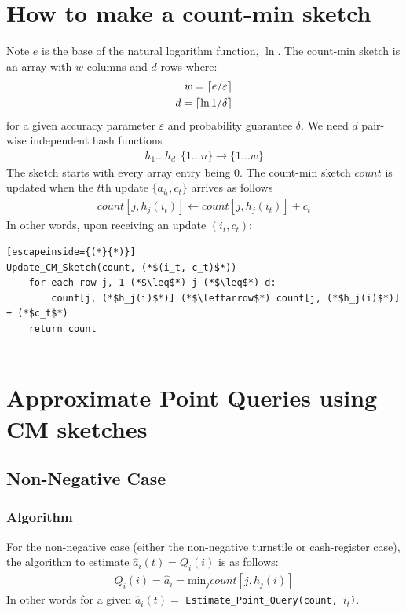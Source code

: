\documentclass[11pt]{article}
\newcommand{\comment}[1]{}
\newcommand{\sq}{\mathit{Q}_i}
\DeclarePairedDelimiter\ceil{\lceil}{\rceil}
\newcommand{\ra}{\rightarrow}
\begin{document}
\section{How to make a count-min sketch}
Note $e$ is the base of the natural logarithm function, $\ln$. The count-min
sketch is an array with $w$ columns and $d$ rows where:
\begin{align}
    w = \ceil{e/\varepsilon}\\
    d = \ceil{\ln{1/\delta}}
\end{align}
for a given accuracy parameter $\varepsilon$ and probability guarantee $\delta$.
We need $d$ pair-wise independent hash functions
\begin{align}
    h_1 \dots h_d : \{1 \dots n\} \ra \{1 \dots w\} 
\end{align}
The sketch starts with every array entry being 0. The count-min sketch $count$
is updated when the $t$th update $\{a_{i_t}, c_t\}$ arrives as follows
\begin{align}
    count[j, h_j(i_t)] \leftarrow count[j, h_j(i_t)] + c_t     
\end{align}
In other words, upon receiving an update $(i_t, c_t)$:
\begin{lstlisting}[escapeinside={(*}{*)}]
Update_CM_Sketch(count, (*$(i_t, c_t)$*)) 
    for each row j, 1 (*$\leq$*) j (*$\leq$*) d:
        count[j, (*$h_j(i)$*)] (*$\leftarrow$*) count[j, (*$h_j(i)$*)] + (*$c_t$*)
    return count 
    
\end{lstlisting}

\comment{
\begin{enumerate}
    \item for each row $1 \leq j \leq d$
    \begin{enumerate}
        \item add $c_t$ to the $h_j(i)$th column.
    \end{enumerate}
\end{enumerate}
}


\section{Approximate Point Queries using CM sketches}

\subsection{Non-Negative Case}
\subsubsection{Algorithm}
For the non-negative case (either the non-negative turnstile or cash-register case),
the algorithm to estimate $\hat{a}_i(t) = \sq(i)$ is as follows: 
\begin{align}
    \sq(i) = \hat{a}_i = \text{min}_j count[j, h_j(i)]
\end{align}
In other words for a given $\hat a_i(t) =$ \texttt{Estimate\_Point\_Query(count, $i_t$)}.
\end{document}
